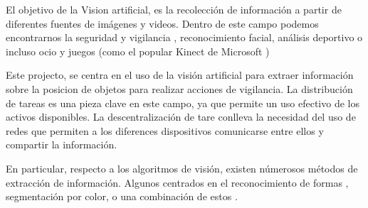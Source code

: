 El objetivo de la Vision artificial, es la recolecci\'on de informaci\'on a partir de diferentes fuentes de im\'agenes y videos. Dentro de este campo podemos encontrarnos la seguridad y vigilancia \cite{traffic_surveillance_pergamon} \cite{distributed_surveillance} \cite{vehicle_detection}, reconocimiento facial, an\'alisis deportivo o incluso ocio y juegos (como el popular Kinect de Microsoft \cite{Kinect_intro})

Este projecto, se centra en el uso de la visi\'on artificial para extraer informaci\'on sobre la posicion de objetos para realizar acciones de vigilancia. La distribuci\'on de tareas \cite{Coop_Surv_aerial_JJ} \cite{Consensus_reaching_Xiao} \cite{Adaptative_tast_Meuth} \cite{distributed_architecture_Ivan_Maza} es una pieza clave en este campo, ya que permite un uso efectivo de los activos disponibles. La descentralizaci\'on de tare \cite{descentralized_task_UAV} conlleva la necesidad del uso de redes que permiten a los diferences dispositivos comunicarse entre ellos y compartir la informaci\'on.

En particular, respecto a los algoritmos de visi\'on, existen n\'umerosos m\'etodos de extracci\'on de informaci\'on. Algunos centrados en el reconocimiento de formas \cite{shape_using_shape_context} \cite{Vehicle_recog_markov}, segmentaci\'on por color, o una combinaci\'on de estos \cite{realtime_signal_recon_shape_color} \cite{signal_recogn_shape_color} \cite{Robust_RT_tracking_color_face_Darrell}.


